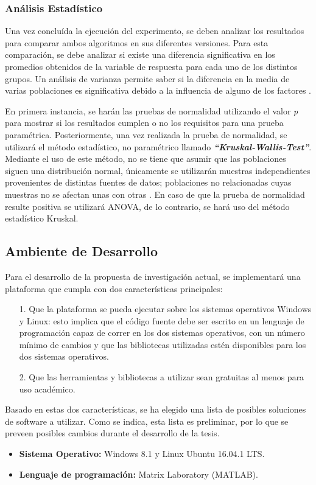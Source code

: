\subsubsection{An\'alisis Estad\'istico}
Una vez conclu\'ida la ejecuci\'on del experimento, se deben analizar los resultados para comparar ambos algoritmos en sus diferentes versiones. Para esta comparaci\'on, se debe analizar si existe una diferencia significativa en los promedios obtenidos de la variable de respuesta para cada uno de los distintos grupos.
Un an\'alisis de varianza permite saber si la diferencia en la media de varias poblaciones es significativa debido a la influencia de alguno de los factores \cite{designexp}.\par 
En primera instancia, se har\'an las pruebas de normalidad utilizando el valor \textit{p} para mostrar si los resultados cumplen o no los requisitos para una prueba param\'etrica. Posteriormente, una vez realizada la prueba de normalidad, se utilizar\'a el m\'etodo estad\'istico, no param\'etrico llamado \textit{\textbf{\enquote{Kruskal-Wallis-Test}}}. Mediante el uso de este m\'etodo, no se tiene que asumir que las poblaciones siguen una distribuci\'on normal, \'unicamente se utilizar\'an muestras independientes provenientes de distintas fuentes de datos; poblaciones no relacionadas cuyas muestras no se afectan unas con otras \cite{kruskwal}.
En caso de que la prueba de normalidad resulte positiva se utilizar\'a ANOVA, de lo contrario, se har\'a uso del m\'etodo estad\'istico Kruskal.
\subsection{Ambiente de Desarrollo}
Para el desarrollo de la propuesta de investigaci\'on actual, se implementar\'a una plataforma que cumpla con dos caracter\'isticas principales:
\begin{itemize}
\item [1.] Que la plataforma se pueda ejecutar sobre los sistemas operativos Windows y Linux: esto implica que el c\'odigo fuente debe ser escrito en un lenguaje de programaci\'on capaz de correr en los dos sistemas operativos, con un n\'umero m\'inimo de cambios y que las bibliotecas utilizadas est\'en disponibles para los dos sistemas operativos.
\item [2.] Que las herramientas y bibliotecas a utilizar sean gratuitas al menos para uso acad\'emico.
\end{itemize}
Basado en estas dos caracter\'isticas, se ha elegido una lista de posibles soluciones de software a utilizar. Como se indica, esta lista es preliminar, por lo que se preveen posibles cambios durante el desarrollo de la tesis.
\begin{itemize}
\item \textbf{Sistema Operativo:} Windows 8.1 y Linux Ubuntu 16.04.1 LTS.
\item \textbf{Lenguaje de programaci\'on:} Matrix Laboratory (MATLAB).
\end{itemize}

